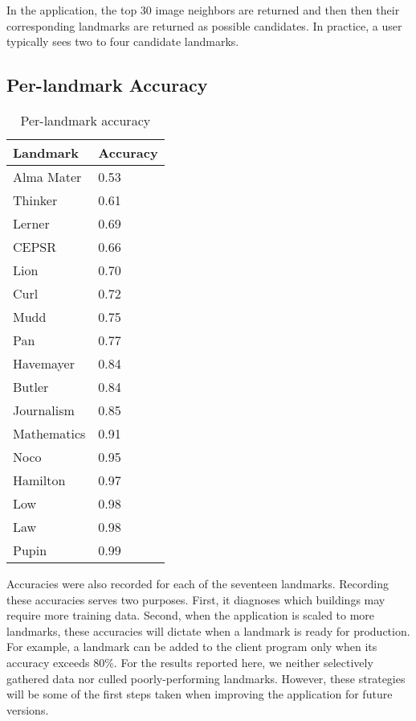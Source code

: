 In the application, the top 30 image neighbors are returned and then then their corresponding landmarks are returned as possible candidates. In practice, a user typically sees two to four candidate landmarks.

\subsection{Per-landmark Accuracy}

\begin{table}[ht!]
\label{tab:results}
\centering
\begin{tabular}{| l | l |}
\hline
Landmark & Accuracy \\ \hline
Alma Mater	   &	0.53 \\ 
Thinker      &    0.61 \\ 
Lerner        &    0.69 \\ 
CEPSR          &    0.66 \\ 
Lion         &    0.70 \\ 
Curl           &    0.72 \\ 
Mudd           &    0.75 \\ 
Pan           &    0.77 \\ 
Havemayer      &    0.84 \\ 
Butler         &    0.84 \\ 
Journalism     &    0.85 \\ 
Mathematics    &    0.91 \\ 
Noco           &    0.95 \\ 
Hamilton       &    0.97 \\ 
Low            &    0.98 \\ 
Law            &    0.98 \\ 
Pupin          &    0.99 \\ \hline
\end{tabular}
\vspace*{10pt}
\caption{Per-landmark accuracy}
\end{table}

Accuracies were also recorded for each of the seventeen landmarks. Recording these accuracies serves two purposes. First, it diagnoses which buildings may require more training data. Second, when the application is scaled to more landmarks, these accuracies will dictate when a landmark is ready for production. For example, a landmark can be added to the client program only when its accuracy exceeds 80\%. For the results reported here, we neither selectively gathered data nor culled poorly-performing landmarks. However, these strategies will be some of the first steps taken when improving the application for future versions.  
